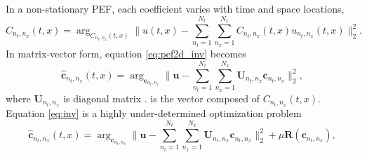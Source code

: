 In a non-stationary PEF, each coefficient varies with time and space locations,
\begin{equation}
\label{eq:pef2d_inv}
\hat{C}_{n_t,n_x}(t,x) = \arg_{C_{n_t,n_x}(t,x)} \parallel u(t,x) - \sum_{n_t=1}^{N_t}\sum_{n_x=1}^{N_x} C_{n_t,n_x}(t,x)u_{n_t,n_x}(t,x) \parallel_2^2.
\end{equation}
In matrix-vector form, equation \ref{eq:pef2d_inv} becomes
\begin{equation}
\label{eq:inv}
\hat{\mathbf{c}}_{n_t,n_x}(t,x) = \arg_{\mathbf{c}_{n_t,n_x}} \parallel \mathbf{u} - \sum_{n_t=1}^{N_t}\sum_{n_x=1}^{N_x} \mathbf{U}_{n_t,n_x} \mathbf{c}_{n_t,n_x} \parallel_2^2,
\end{equation}
where $\mathbf{U}_{n_t,n_x}$ is  diagonal matrix .  is the vector composed of $C_{n_t,n_x}(t,x)$. Equation \ref{eq:inv} is a highly under-determined optimization problem
\begin{equation}
\label{eq:inv}
\hat{\mathbf{c}}_{n_t,n_x}(t,x) = \arg_{\mathbf{c}_{n_t,n_x}} \parallel \mathbf{u} - \sum_{n_t=1}^{N_t}\sum_{n_x=1}^{N_x} \mathbf{U}_{n_t,n_x}\mathbf{c}_{n_t,n_x} \parallel_2^2 + \mu \mathbf{R}(\mathbf{c}_{n_t,n_x}),
\end{equation}
  



